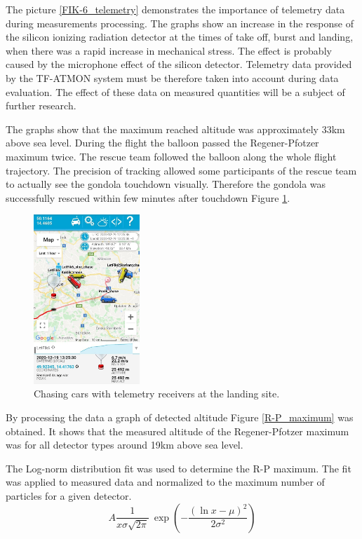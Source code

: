 \documentclass{Rpd}
\begin{document}
The picture \ref{FIK-6_telemetry} demonstrates the importance of telemetry data during measurements processing. The graphs show an increase in the response of the silicon ionizing radiation detector at the times of take off, burst and landing, when there was a rapid increase in mechanical stress. The effect is probably caused by the microphone effect of the silicon detector. Telemetry data provided by the TF-ATMON system must be therefore taken into account during data evaluation. The effect of these data on measured quantities will be a subject of further research. 


The graphs show that the maximum reached altitude was approximately 33km above sea level. During the flight the balloon passed the Regener-Pfotzer maximum twice. The rescue team followed the balloon along the whole flight trajectory. The precision of tracking allowed some participants of the rescue team to actually see the gondola touchdown visually. Therefore the gondola was successfully rescued within few minutes after touchdown Figure \ref{FIK-6_rescue_team}.

\begin{figure}%
	\centerline{\includegraphics[width=40mm]{img/FIK-6_rescue_team.png}}
	\caption{Chasing cars with telemetry receivers at the landing site. \label{FIK-6_rescue_team}}
\end{figure}

By processing the data a graph of detected altitude Figure \ref{R-P_maximum} was obtained. It shows that the measured altitude of the Regener-Pfotzer maximum was for all detector types around 19km above sea level.

The Log-norm distribution fit was used to determine the R-P maximum. The fit was applied to measured data and normalized to the maximum number of particles for a given detector.
\begin{equation}A \frac 1 {x\sigma\sqrt{2\pi}}\ \exp\left( - \frac{\left(\ln x-\mu\right)^2}{2\sigma^2}\right)\end{equation}
\end{document}
